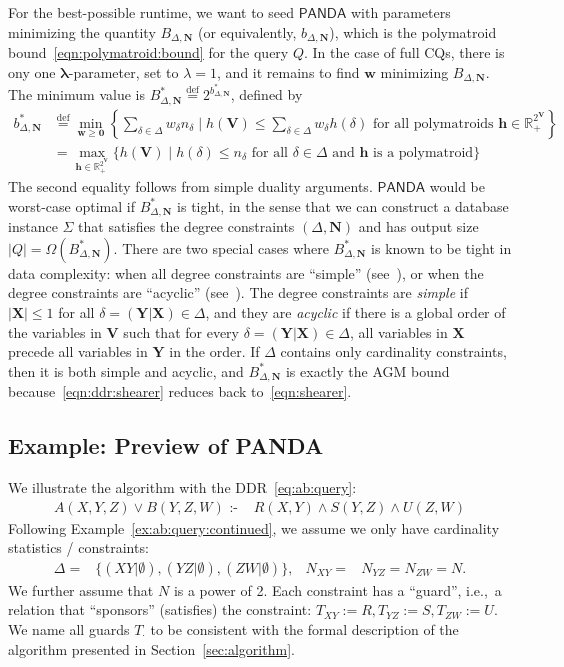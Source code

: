 \documentclass{theoretics}
\newcommand{\set}[1]{\{#1\}}                    %
\newcommand{\defeq}{\stackrel{\text{def}}{=}}
\newcommand{\R}{\mathbb R} %
\newcommand{\cd}{\text{ :- }}
\newcommand{\agm}{\textsf{AGM}\xspace}
\newcommand{\panda}{\textsf{PANDA}\xspace}
\begin{document}
For the best-possible runtime, we want to seed $\panda$ with parameters minimizing the quantity $B_{\Delta,\bm N}$
(or equivalently, $b_{\Delta,\bm N}$),
which is the polymatroid bound~\eqref{eqn:polymatroid:bound} for the query $Q$.
In the case of full CQs, there is ony one $\bm \lambda$-parameter, set to $\lambda=1$, and it remains to find
$\bm w$ minimizing $B_{\Delta,\bm N}$. The minimum value is
$B^*_{\Delta, \bm N} \defeq 2^{b^*_{\Delta,\bm N}}$, defined by
\begin{align*}
b^*_{\Delta,\bm N} &\defeq \min_{\bm w \geq \bm 0} \left\{
  \sum_{\delta \in \Delta} w_\delta n_\delta
  \mid
  h(\bm V) \leq \sum_{\delta \in \Delta} w_\delta h(\delta) \text{ for all polymatroids } \bm h \in \R_+^{2^{\bm V}}
  \right\} \\
  &= \max_{\bm h \in \R_+^{2^{\bm V}}} \biggl\{
      h(\bm V) \mid h(\delta) \leq n_\delta \text{ for all } \delta \in \Delta
     \text{ and } \bm h \text{ is a polymatroid}
    \biggr\}
\end{align*}
The second equality follows from simple duality arguments.
$\panda$ would be worst-case optimal if
$B^*_{\Delta,\bm N}$ is tight, in the sense that we can construct a database instance
$\Sigma$ that satisfies the degree constraints $(\Delta,\bm N)$ and has output size $|Q| =
\Omega(B^*_{\Delta,\bm N})$. There are two special cases where $B^*_{\Delta,\bm N}$ is known
to be tight in data complexity: when all degree constraints are ``simple''
(see~\cite{DBLP:journals/tods/KhamisKNS21, 10175769}), or when the degree constraints are
``acyclic'' (see~\cite{DBLP:conf/pods/KhamisNS16,10.1145/3196959.3196990}). The degree
constraints are {\em simple} if $|\bm X| \leq 1$ for all $\delta = (\bm Y|\bm X) \in \Delta$, and
they are {\em acyclic} if there is a global order of the variables in $\bm V$ such that for every
$\delta = (\bm Y|\bm X) \in \Delta$, all variables in $\bm X$ precede all variables in $\bm
Y$ in the order.
If $\Delta$ contains only cardinality constraints, then it is both simple and acyclic,
and $B^*_{\Delta,\bm N}$ is exactly the \agm bound because~\eqref{eqn:ddr:shearer} reduces back to~\eqref{eqn:shearer}.

\subsection{Example: Preview of  \panda}
\label{subsec:example2}


We illustrate the algorithm with the DDR~\eqref{eq:ab:query}:
\begin{align*}
  A(X,Y,Z) \vee B(Y,Z,W) \cd & R(X,Y) \wedge S(Y,Z) \wedge U(Z,W)
\end{align*}
%
Following Example~\ref{ex:ab:query:continued}, we assume we only have cardinality statistics / constraints:
\begin{align*}
  \Delta = & \set{(XY|\emptyset), (YZ|\emptyset), (ZW|\emptyset)}, & N_{XY}=&N_{YZ}=N_{ZW}=N.
\end{align*}
%
We further assume that $N$ is a power of 2.
Each constraint has a ``guard'', i.e.,~a relation that ``sponsors'' (satisfies)
the constraint:
$T_{XY}:=R, T_{YZ}:=S, T_{ZW}:=U$. We name all guards $T_{\cdot}$ to be consistent with the
formal description of the algorithm presented in Section~\ref{sec:algorithm}.
\end{document}
